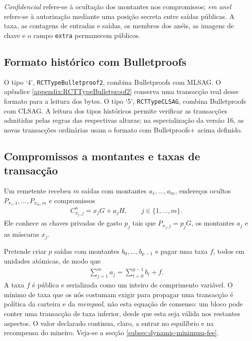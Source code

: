 \emph{Confidencial} refere-se à ocultação dos montantes nos compromissos;
\emph{em anel} refere-se à autorização mediante uma posição secreta entre
saídas públicas. A taxa, as contagens de entradas e saídas, os membros dos
anéis, as imagens de chave e o campo \texttt{extra} permanecem públicos.

\subsection*{Formato histórico com Bulletproofs}
\label{sec:RCTTypeBulletproof2}

%
O tipo `4', \texttt{RCTTypeBulletproof2}, combina Bulletproofs com MLSAG.
O apêndice \ref{appendix:RCTTypeBulletproof2} conserva uma transacção real
desse formato para a leitura dos bytes. O tipo `5', \texttt{RCTTypeCLSAG},
combina Bulletproofs com CLSAG. A leitura dos tipos históricos permite
verificar as transacções admitidas pelas regras das respectivas alturas;
na especialização da versão 16, as novas transacções ordinárias usam o
formato com Bulletproofs+ acima definido.

\subsection{Compromissos a montantes e taxas de transacção}
\label{sec:commitments-and-fees}

Um remetente recebeu \(m\) saídas com montantes
\(a_1,\ldots,a_m\), endereços ocultos
\(P_{\pi_1,1},\ldots,P_{\pi_m,m}\) e compromissos
\begin{align*}
 C^a_{\pi_j,j}=x_jG+a_jH,\qquad j\in\{1,\ldots,m\}.
\end{align*}
Ele conhece as chaves privadas de gasto \(p_j\) tais que
\(P_{\pi_j,j}=p_jG\), os montantes \(a_j\) e as máscaras \(x_j\).

Pretende criar \(p\) saídas com montantes \(b_0,\ldots,b_{p-1}\) e pagar uma
taxa \(f\), todos em unidades atómicas, de modo que
\begin{align}
 \sum_{j=1}^{m}a_j
   =\sum_{t=0}^{p-1}b_t+f.
 \label{eq:transaction-amount-balance}
\end{align}
A taxa \(f\) é pública e serializada como um inteiro de comprimento
variável. O mínimo de taxa que os nós costumam exigir para propagar uma
transacção é política da carteira e da \emph{mempool}, não esta equação de
consenso: um bloco pode conter uma transacção de taxa inferior, desde que
esta seja válida nos restantes aspectos. O valor declarado continua, claro,
a entrar no equilíbrio e na recompensa do mineiro. Veja-se a secção
\ref{subsec:dynamic-minimum-fee}.

